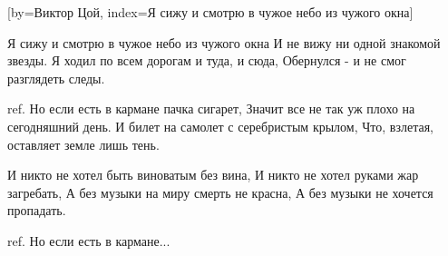[by={Виктор Цой},
                     index={Я сижу и смотрю в чужое небо из чужого окна}]
\beginverse

Я сижу и смотрю в чужое небо из чужого окна
И не вижу ни одной знакомой звезды.
Я ходил по всем дорогам и туда, и сюда,
Обернулся - и не смог разглядеть следы.

\endverse
\beginverse

ref.
Но если есть в кармане пачка сигарет,
Значит все не так уж плохо на сегодняшний день.
И билет на самолет с серебристым крылом,
Что, взлетая, оставляет земле лишь тень.

\endverse
\beginverse

И никто не хотел быть виноватым без вина,
И никто не хотел руками жар загребать,
А без музыки на миру смерть не красна,
А без музыки не хочется пропадать.

\endverse
\beginverse

ref.
Но если есть в кармане...

\endverse
\endsong